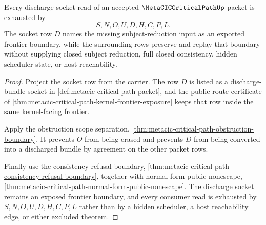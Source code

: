 \begin{theorem}
\label{thm:metacic-critical-path-discharge-socket-frontier-exhaustion}
Every discharge-socket read of an accepted $\MetaCICCriticalPathUp$ packet is exhausted by
$$
S,N,O,U,D,H,C,P,L.
$$
The socket row $D$ names the missing subject-reduction input as an exported frontier boundary, while the surrounding rows preserve and replay that boundary without supplying closed subject reduction, full closed consistency, hidden scheduler state, or host reachability.
\end{theorem}
\begin{proof}
Project the socket row from the carrier. The row $D$ is listed as a discharge-bundle socket in \autoref{def:metacic-critical-path-packet}, and the public route certificate of \autoref{thm:metacic-critical-path-kernel-frontier-exposure} keeps that row inside the same kernel-facing frontier.

Apply the obstruction scope separation, \autoref{thm:metacic-critical-path-obstruction-boundary}. It prevents $O$ from being erased and prevents $D$ from being converted into a discharged bundle by agreement on the other packet rows.

Finally use the consistency refusal boundary, \autoref{thm:metacic-critical-path-consistency-refusal-boundary}, together with normal-form public nonescape, \autoref{thm:metacic-critical-path-normal-form-public-nonescape}. The discharge socket remains an exposed frontier boundary, and every consumer read is exhausted by $S,N,O,U,D,H,C,P,L$ rather than by a hidden scheduler, a host reachability edge, or either excluded theorem.
\end{proof}
